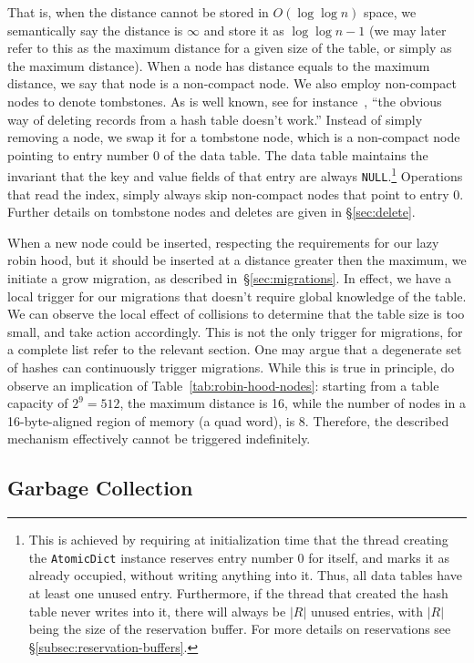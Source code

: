That is, when the distance cannot be stored in $O(\log \log n)$ space, we semantically say the distance is $\infty$ and store it as $\log \log n - 1$ (we may later refer to this as the maximum distance for a given size of the table, or simply as the maximum distance).
When a node has distance equals to the maximum distance, we say that node is a non-compact node.
We also employ non-compact nodes to denote tombstones.
As is well known, see for instance~\cite[\S6.4]{the-art-vol-2}, ``the obvious way of deleting records from a hash table doesn't work.''
Instead of simply removing a node, we swap it for a tombstone node, which is a non-compact node pointing to entry number 0 of the data table.
The data table maintains the invariant that the key and value fields of that entry are always \texttt{NULL}.\footnote{%
	This is achieved by requiring at initialization time that the thread creating the \texttt{AtomicDict} instance reserves entry number 0 for itself, and marks it as already occupied, without writing anything into it.
	Thus, all data tables have at least one unused entry.
	Furthermore, if the thread that created the hash table never writes into it, there will always be $|R|$ unused entries, with $|R|$ being the size of the reservation buffer.
	For more details on reservations see \S\ref{subsec:reservation-buffers}.
}
Operations that read the index, simply always skip non-compact nodes that point to entry 0.
Further details on tombstone nodes and deletes are given in \S\ref{sec:delete}.

When a new node could be inserted, respecting the requirements for our lazy robin hood, but it should be inserted at a distance greater then the maximum, we initiate a grow migration, as described in~\S\ref{sec:migrations}.
In effect, we have a local trigger for our migrations that doesn't require global knowledge of the table.
We can observe the local effect of collisions to determine that the table size is too small, and take action accordingly.
This is not the only trigger for migrations, for a complete list refer to the relevant section.
One may argue that a degenerate set of hashes can continuously trigger migrations.
While this is true in principle, do observe an implication of Table~\ref{tab:robin-hood-nodes}: starting from a table capacity of $2^9 = 512$, the maximum distance is 16, while the number of nodes in a 16-byte-aligned region of memory (a quad word), is 8.
Therefore, the described mechanism effectively cannot be triggered indefinitely.


\subsection{Garbage Collection}\label{subsec:garbage-collection}


